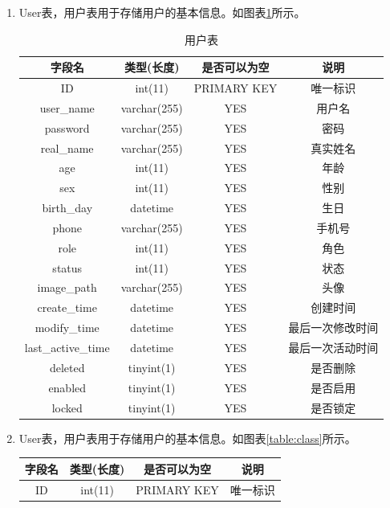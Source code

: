 \begin{enumerate}
	\item[(1)] User表，用户表用于存储用户的基本信息。如图表\ref{table:user}所示。
	\begin{table}[!htbp]
		\centering
		\begin{tabular}{|c|c|c|c|}
			\hline
			字段名 & 类型(长度) & 是否可以为空 & 说明 \\
			\hline
			ID & int(11) & PRIMARY KEY & 唯一标识 \\
			\hline
			user\_name & varchar(255) & YES & 用户名 \\
			\hline
			password & varchar(255) & YES & 密码 \\
			\hline
			real\_name & varchar(255) & YES & 真实姓名 \\
			\hline
			age & int(11) & YES	 & 年龄 \\
			\hline
			sex & int(11) & YES & 性别 \\
			\hline
			birth\_day & datetime & YES & 生日 \\
			\hline
			phone & varchar(255) & YES & 手机号 \\
			\hline
			role & int(11) & YES & 角色 \\
			\hline
			status & int(11) & YES & 状态 \\
			\hline
			image\_path & varchar(255) & YES & 头像 \\
			\hline
			create\_time & datetime & YES & 创建时间 \\
			\hline
			modify\_time & datetime & YES & 最后一次修改时间 \\
			\hline
			last\_active\_time & datetime & YES & 最后一次活动时间 \\
			\hline
			deleted & tinyint(1) & YES & 是否删除 \\
			\hline
			enabled & tinyint(1) & YES & 是否启用 \\
			\hline
			locked & tinyint(1) & YES & 是否锁定 \\
			\hline
		\end{tabular}
		\caption{用户表}
		\label{table:user}
	\end{table}
	\item[(2)] User表，用户表用于存储用户的基本信息。如图表\ref{table:class}所示。
	\begin{table}[!htbp]
		\centering
		\begin{tabular}{|c|c|c|c|}
			\hline
			字段名 & 类型(长度) & 是否可以为空 & 说明 \\
			\hline
			ID & int(11) & PRIMARY KEY & 唯一标识 \\

\end{tabular}
\end{table}
\end{enumerate}
